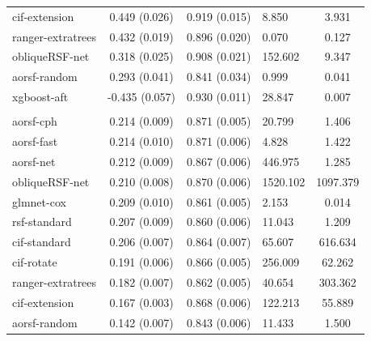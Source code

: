 \documentclass[twoside,11pt]{article}\usepackage[]{graphicx}\usepackage[]{xcolor}
\newenvironment{knitrout}{}{} %
\begin{document}
\begin{knitrout}
\begin{longtable}[t]{lcclc}
\hspace{1em}cif-extension & 0.449 (0.026) & 0.919 (0.015) & 8.850 & 3.931\\
\hspace{1em}ranger-extratrees & 0.432 (0.019) & 0.896 (0.020) & 0.070 & 0.127\\
\hspace{1em}obliqueRSF-net & 0.318 (0.025) & 0.908 (0.021) & 152.602 & 9.347\\
\hspace{1em}aorsf-random & 0.293 (0.041) & 0.841 (0.034) & 0.999 & 0.041\\
\hspace{1em}xgboost-aft & -0.435 (0.057) & 0.930 (0.011) & 28.847 & 0.007\\
\addlinespace[0.3em]
\hline
\multicolumn{5}{l}{\textit{\textbf{Non-alcohol fatty liver disease; death, n = 17549, p = 24}}}\\
\hline
\hspace{1em}aorsf-cph & 0.214 (0.009) & 0.871 (0.005) & 20.799 & 1.406\\
\hspace{1em}aorsf-fast & 0.214 (0.010) & 0.871 (0.006) & 4.828 & 1.422\\
\hspace{1em}aorsf-net & 0.212 (0.009) & 0.867 (0.006) & 446.975 & 1.285\\
\hspace{1em}obliqueRSF-net & 0.210 (0.008) & 0.870 (0.006) & 1520.102 & 1097.379\\
\hspace{1em}glmnet-cox & 0.209 (0.010) & 0.861 (0.005) & 2.153 & 0.014\\
\hspace{1em}rsf-standard & 0.207 (0.009) & 0.860 (0.006) & 11.043 & 1.209\\
\hspace{1em}cif-standard & 0.206 (0.007) & 0.864 (0.007) & 65.607 & 616.634\\
\hspace{1em}cif-rotate & 0.191 (0.006) & 0.866 (0.005) & 256.009 & 62.262\\
\hspace{1em}ranger-extratrees & 0.182 (0.007) & 0.862 (0.005) & 40.654 & 303.362\\
\hspace{1em}cif-extension & 0.167 (0.003) & 0.868 (0.006) & 122.213 & 55.889\\
\hspace{1em}aorsf-random & 0.142 (0.007) & 0.843 (0.006) & 11.433 & 1.500\\

\end{longtable}
\end{knitrout}
\end{document}
